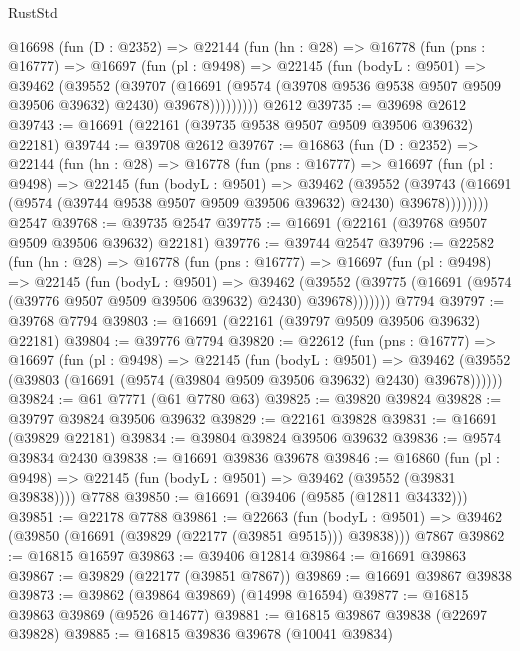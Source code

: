 \begin{lexlean}{RustStd}
\begin{coremodule}
    @16698
      (fun (D : @2352) =>
      @22144
        (fun (hn : @28) =>
        @16778
          (fun (pns : @16777) =>
          @16697
            (fun (pl : @9498) =>
            @22145
              (fun (bodyL : @9501) =>
              @39462
                (@39552
                  (@39707
                    (@16691
                      (@9574 (@39708 @9536 @9538 @9507 @9509 @39506 @39632) @2430)
                      @39678)))))))))
    @2612
@39735 := @39698 @2612
@39743 := @16691 (@22161 (@39735 @9538 @9507 @9509 @39506 @39632) @22181)
@39744 := @39708 @2612
@39767 := @16863
    (fun (D : @2352) =>
    @22144
      (fun (hn : @28) =>
      @16778
        (fun (pns : @16777) =>
        @16697
          (fun (pl : @9498) =>
          @22145
            (fun (bodyL : @9501) =>
            @39462
              (@39552
                (@39743
                  (@16691 (@9574 (@39744 @9538 @9507 @9509 @39506 @39632) @2430) @39678))))))))
    @2547
@39768 := @39735 @2547
@39775 := @16691 (@22161 (@39768 @9507 @9509 @39506 @39632) @22181)
@39776 := @39744 @2547
@39796 := @22582
    (fun (hn : @28) =>
    @16778
      (fun (pns : @16777) =>
      @16697
        (fun (pl : @9498) =>
        @22145
          (fun (bodyL : @9501) =>
          @39462
            (@39552 (@39775 (@16691 (@9574 (@39776 @9507 @9509 @39506 @39632) @2430) @39678)))))))
    @7794
@39797 := @39768 @7794
@39803 := @16691 (@22161 (@39797 @9509 @39506 @39632) @22181)
@39804 := @39776 @7794
@39820 := @22612
    (fun (pns : @16777) =>
    @16697
      (fun (pl : @9498) =>
      @22145
        (fun (bodyL : @9501) =>
        @39462 (@39552 (@39803 (@16691 (@9574 (@39804 @9509 @39506 @39632) @2430) @39678))))))
@39824 := @61 @7771 (@61 @7780 @63)
@39825 := @39820 @39824
@39828 := @39797 @39824 @39506 @39632
@39829 := @22161 @39828
@39831 := @16691 (@39829 @22181)
@39834 := @39804 @39824 @39506 @39632
@39836 := @9574 @39834 @2430
@39838 := @16691 @39836 @39678
@39846 := @16860
    (fun (pl : @9498) => @22145 (fun (bodyL : @9501) => @39462 (@39552 (@39831 @39838))))
    @7788
@39850 := @16691 (@39406 (@9585 (@12811 @34332)))
@39851 := @22178 @7788
@39861 := @22663
    (fun (bodyL : @9501) => @39462 (@39850 (@16691 (@39829 (@22177 (@39851 @9515))) @39838)))
    @7867
@39862 := @16815 @16597
@39863 := @39406 @12814
@39864 := @16691 @39863
@39867 := @39829 (@22177 (@39851 @7867))
@39869 := @16691 @39867 @39838
@39873 := @39862 (@39864 @39869) (@14998 @16594)
@39877 := @16815 @39863 @39869 (@9526 @14677)
@39881 := @16815 @39867 @39838 (@22697 @39828)
@39885 := @16815 @39836 @39678 (@10041 @39834)

\end{coremodule}
\end{lexlean}
